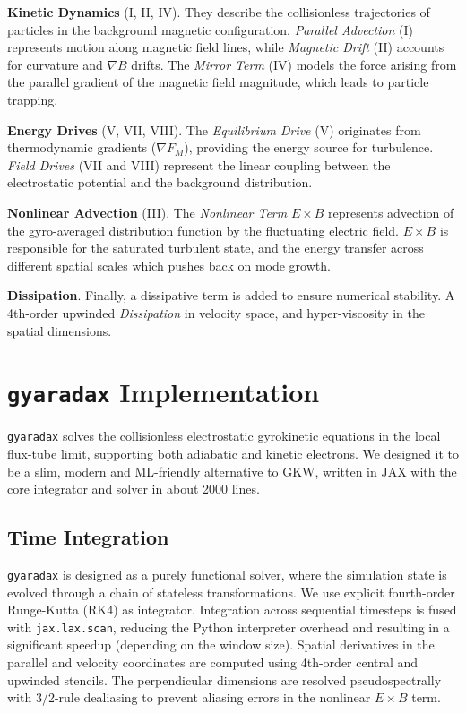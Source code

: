 \documentclass{article}
\theoremstyle{plain}
\theoremstyle{definition}
\theoremstyle{remark}
\begin{document}
%
\colorbox{jaxpurple!20}{\textbf{Kinetic Dynamics} (I, II, IV).} They describe the collisionless trajectories of particles in the background magnetic configuration. \textit{Parallel Advection} (I) represents motion along magnetic field lines, while \textit{Magnetic Drift} (II) accounts for curvature and $\nabla B$ drifts. The \textit{Mirror Term} (IV) models the force arising from the parallel gradient of the magnetic field magnitude, which leads to particle trapping.
%

\colorbox{jaxtealdark!20}{\textbf{Energy Drives} (V, VII, VIII).} The \textit{Equilibrium Drive} (V) originates from thermodynamic gradients ($\nabla F_M$), providing the energy source for turbulence. \textit{Field Drives} (VII and VIII) represent the linear coupling between the electrostatic potential and the background distribution.
%

\colorbox{jaxred!20}{\textbf{Nonlinear Advection} (III).} The \textit{Nonlinear Term} $E \times B$ represents advection of the gyro-averaged distribution function by the fluctuating electric field. $E \times B$ is responsible for the saturated turbulent state, and the energy transfer across different spatial scales which pushes back on mode growth.
%

\colorbox{gray!25}{\textbf{Dissipation}.} Finally, a dissipative term is added to ensure numerical stability. A 4th-order upwinded \textit{Dissipation} in velocity space, and hyper-viscosity in the spatial dimensions.


\section{\texttt{gyaradax} Implementation}
\label{sec:gyaradax}
\texttt{gyaradax} solves the collisionless electrostatic gyrokinetic equations in the local flux-tube limit, supporting both adiabatic and kinetic electrons. We designed it to be a slim, modern and ML-friendly alternative to GKW, written in JAX with the core integrator and solver in about 2000 lines.

\subsection{Time Integration}
\texttt{gyaradax} is designed as a purely functional solver, where the simulation state is evolved through a chain of stateless transformations.
%
We use explicit fourth-order Runge-Kutta (RK4) as integrator.
%
Integration across sequential timesteps is fused with \texttt{jax.lax.scan}, reducing the Python interpreter overhead and resulting in a significant speedup (depending on the window size).
%
Spatial derivatives in the parallel and velocity coordinates are computed using 4th-order central and upwinded stencils. The perpendicular dimensions are resolved pseudospectrally with 3/2-rule dealiasing to prevent aliasing errors in the nonlinear $E \times B$ term.
\end{document}
